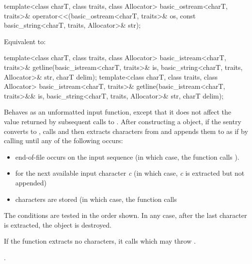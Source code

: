 %
\begin{itemdecl}
template<class charT, class traits, class Allocator>
  basic_ostream<charT, traits>&
    operator<<(basic_ostream<charT, traits>& os,
               const basic_string<charT, traits, Allocator>& str);
\end{itemdecl}

\begin{itemdescr}
\pnum
\effects
Equivalent to: 
\end{itemdescr}

%
\begin{itemdecl}
template<class charT, class traits, class Allocator>
  basic_istream<charT, traits>&
    getline(basic_istream<charT, traits>& is,
            basic_string<charT, traits, Allocator>& str,
            charT delim);
template<class charT, class traits, class Allocator>
  basic_istream<charT, traits>&
    getline(basic_istream<charT, traits>&& is,
            basic_string<charT, traits, Allocator>& str,
            charT delim);
\end{itemdecl}

\begin{itemdescr}
\pnum
\effects
Behaves as an unformatted input function,
except that it does not affect the value returned by subsequent calls to
.
After constructing a
object, if the sentry converts to , calls
and then extracts characters from  and appends them
to  as if by calling
until any of the following occurs:
\begin{itemize}
\item
end-of-file occurs on the input sequence
(in which case, the
function calls
).
\item
{}
for the next available input character
\textit{c}
(in which case,
\textit{c}
is extracted but not appended)
\item
{}
characters are stored
(in which case,
the function calls
\end{itemize}

\pnum
The conditions are tested in the order shown.
In any case,
after the last character is extracted, the
object is destroyed.

\pnum
If the function extracts no characters, it calls
which may throw
.

\pnum
\returns
{}.
\end{itemdescr}

